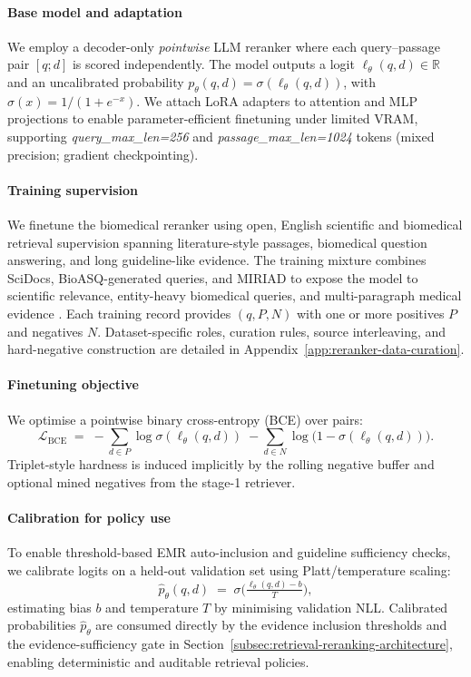 \documentclass[conference]{IEEEtran}
\begin{document}
\paragraph{Base model and adaptation}
We employ a decoder-only \emph{pointwise} LLM reranker where each query–passage pair $[q;d]$ is scored independently. The model outputs a logit $\ell_\theta(q,d)\in\mathbb{R}$ and an uncalibrated probability $p_\theta(q,d)=\sigma(\ell_\theta(q,d))$, with $\sigma(x)=1/(1+e^{-x})$. We attach LoRA adapters to attention and MLP projections to enable parameter-efficient finetuning under limited VRAM, supporting \textit{query\_max\_len=256} and \textit{passage\_max\_len=1024} tokens (mixed precision; gradient checkpointing).

\paragraph{Training supervision}
We finetune the biomedical reranker using open, English scientific and biomedical retrieval supervision spanning literature-style passages, biomedical question answering, and long guideline-like evidence. The training mixture combines SciDocs, BioASQ-generated queries, and MIRIAD to expose the model to scientific relevance, entity-heavy biomedical queries, and multi-paragraph medical evidence \cite{beirscidocs,bioasqgen,miriad}. Each training record provides $(q,P,N)$ with one or more positives $P$ and negatives $N$. Dataset-specific roles, curation rules, source interleaving, and hard-negative construction are detailed in Appendix~\ref{app:reranker-data-curation}.


\paragraph{Finetuning objective}
We optimise a pointwise binary cross-entropy (BCE) over pairs:
\begin{equation}
\label{eq:bce-reranker}
    \mathcal{L}_{\mathrm{BCE}}
    \;=\;
    -\!\!\sum_{d\in P}\!\log \sigma(\ell_\theta(q,d))
    \;-\!\!\sum_{d\in N}\!\log\big(1-\sigma(\ell_\theta(q,d))\big).
\end{equation}
Triplet-style hardness is induced implicitly by the rolling negative buffer and optional mined negatives from the stage-1 retriever.

\paragraph{Calibration for policy use}
To enable threshold-based EMR auto-inclusion and guideline sufficiency checks, we calibrate logits on a held-out validation set using Platt/temperature scaling:
\begin{equation}
\label{eq:calib}
    \widehat{p}_\theta(q,d)\;=\;\sigma\!\Big(\tfrac{\ell_\theta(q,d)-b}{T}\Big),
\end{equation}
estimating bias $b$ and temperature $T$ by minimising validation NLL. Calibrated probabilities $\widehat{p}_\theta$ are consumed directly by the evidence inclusion thresholds and the evidence-sufficiency gate in Section~\ref{subsec:retrieval-reranking-architecture}, enabling deterministic and  auditable retrieval policies.
\end{document}

